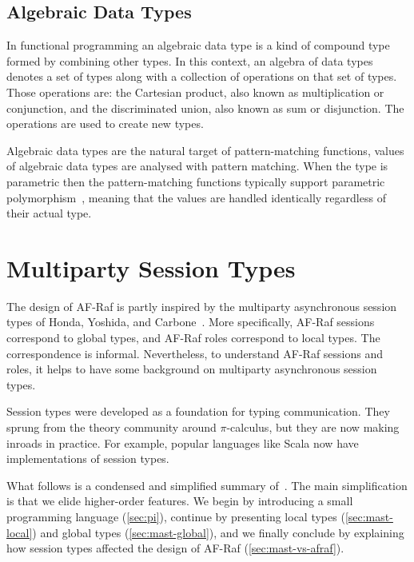 \documentclass[a4paper,12pt,oneside,fleqn]{book} %
\newcommand{\rg}[1]{\marginpar{\tiny\raggedright\textcolor{blue}{\bf rg:} #1}}
\newcommand{\todo}[1]{[\textcolor{red}{TODO}: #1]}
\renewcommand{\rg}{}
\begin{document}
\section{Algebraic Data Types}\label{sec:adt} %

In functional programming an algebraic data type is a kind of compound type
formed by combining other types. In this context, an algebra of data types
denotes a set of types along with a collection of operations on that set of
types. Those operations are: the Cartesian product, also known as
multiplication or conjunction, and the discriminated union, also known as
sum or disjunction. The operations are used to create new types.

Algebraic data types are the natural target of pattern-matching functions,
values of algebraic data types are analysed with pattern matching.  When
the type is parametric then the pattern-matching functions typically
support parametric polymorphism~\cite{AlgebraicDT09}, meaning that the
values are handled identically regardless of their actual type.



\chapter{Multiparty Session Types}\label{ch:multiparty} %

The design of AF-Raf is partly inspired
  by the multiparty asynchronous session types
  of Honda, Yoshida, and Carbone~\cite{DBLP:journals/jacm/HondaYC16}.
More specifically,
  AF-Raf sessions correspond to global types,
  and AF-Raf roles correspond to local types.
The correspondence is informal.
Nevertheless,
  to understand AF-Raf sessions and roles,
  it helps to have some background on multiparty asynchronous session types.

Session types were developed as a foundation for typing communication.
They sprung from the theory community around $\pi$-calculus,
  but they are now making inroads in practice.
For example, popular languages like Scala
  now have implementations of session types.

What follows is a condensed and simplified summary
  of~\cite{DBLP:journals/jacm/HondaYC16}.
The main simplification is that we elide higher-order features.
We begin by introducing a small programming language (\autoref{sec:pi}),
  continue by presenting
    local types (\autoref{sec:mast-local})
    and global types (\autoref{sec:mast-global}),
  and we finally conclude by explaining how session types affected the
    design of AF-Raf (\autoref{sec:mast-vs-afraf}).
\end{document}
